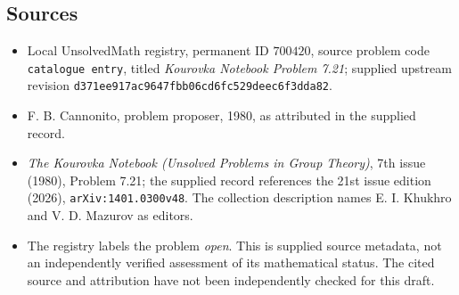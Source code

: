 \documentclass[11pt]{article}
\begin{document}
\subsection{Sources}
\begin{itemize}
\item Local UnsolvedMath registry, permanent ID \(700420\), source problem code \texttt{catalogue entry}, titled \emph{Kourovka Notebook Problem 7.21}; supplied upstream revision \texttt{d371ee917ac9647fbb06cd6fc529deec6f3dda82}.
\item F. B. Cannonito, problem proposer, 1980, as attributed in the supplied record.
\item \emph{The Kourovka Notebook (Unsolved Problems in Group Theory)}, 7th issue (1980), Problem 7.21; the supplied record references the 21st issue edition (2026), \texttt{arXiv:1401.0300v48}. The collection description names E. I. Khukhro and V. D. Mazurov as editors.
\item The registry labels the problem \emph{open}. This is supplied source metadata, not an independently verified assessment of its mathematical status. The cited source and attribution have not been independently checked for this draft.
\end{itemize}
\end{document}
